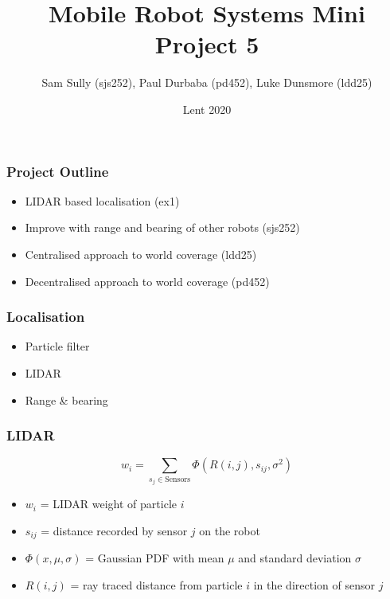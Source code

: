 \documentclass{beamer}
\title{Mobile Robot Systems Mini Project 5}
\author{Sam Sully (sjs252), Paul Durbaba (pd452), Luke Dunsmore (ldd25)}
\date{Lent 2020}
\begin{document}
		
	\frame{\titlepage}
		
	\begin{frame}
		\frametitle{Project Outline}
		\pause
		\begin{itemize}
			\item<2-> LIDAR based localisation (ex1)
			\item<3-> Improve with range and bearing of other robots (sjs252)
			\item<4-> Centralised approach to world coverage (ldd25)
			\item<5-> Decentralised approach to world coverage (pd452)
		\end{itemize}
	\end{frame}
	\begin{frame}
		\frametitle{Localisation}
		\pause
		\begin{itemize}
			\item<2->Particle filter
			\item<3->LIDAR
			\item<4->Range \& bearing
		\end{itemize}
	\end{frame}
	\begin{frame}
		\frametitle{LIDAR}
		\[
		w_i = \sum_{s_{j} \in \mathrm{Sensors}}\Phi(R(i,j), s_{ij}, \sigma^2)
		\]
		\begin{itemize}
			\item $w_i$ = LIDAR weight of particle $i$
			\item $s_{ij}$ = distance recorded by sensor $j$ on the robot
			\item $\Phi(x,\mu,\sigma)$ = Gaussian PDF with mean $\mu$ and standard deviation $\sigma$ 
			\item $R(i,j)$ = ray traced distance from particle $i$ in the direction of sensor $j$
		\end{itemize}
	\end{frame}
\end{document}
